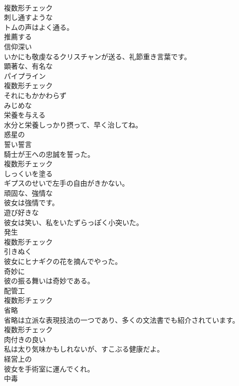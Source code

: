 \documentclass[8pt]{extreport}
\begin{document}
\begin{CJK}{UTF8}{min}
\\	複数形チェック
\\	[形容詞]	刺し通すような	
\\	トムの声はよく通る。	
\\	[動詞]	推薦する	
\\	[形容詞]	信仰深い	
\\	いかにも敬虔なるクリスチャンが送る、礼節重き言葉です。	
\\	[形容詞]	顕著な、有名な	
\\	[名詞]	パイプライン	
\\	複数形チェック
\\	[接続詞]	それにもかかわらず	
\\	[形容詞]	みじめな	
\\	[動詞]	栄養を与える	
\\	水分と栄養しっかり摂って、早く治してね。	
\\	[形容詞]	惑星の	
\\	[名詞]	誓い誓言	
\\	騎士が王への忠誠を誓った。	
\\	複数形チェック
\\	[動詞]	しっくいを塗る	
\\	ギプスのせいで左手の自由がきかない。	
\\	[形容詞]	頑固な、強情な	
\\	彼女は強情です。	
\\	[形容詞]	遊び好きな	
\\	彼女は笑い、私をいたずらっぽく小突いた。	
\\	[名詞]	発生	
\\	複数形チェック
\\	[動詞]	引きぬく	
\\	彼女にヒナギクの花を摘んでやった。	
\\	[副詞]	奇妙に	
\\	彼の振る舞いは奇妙である。	
\\	[名詞]	配管工	
\\	複数形チェック
\\	[名詞]	省略	
\\	省略は立派な表現技法の一つであり、多くの文法書でも紹介されています。	
\\	複数形チェック
\\	[形容詞]	肉付きの良い	
\\	私は太り気味かもしれないが、すこぶる健康だよ。	
\\	[形容詞]	経営上の	
\\	彼女を手術室に運んでくれ。	
\\	[名詞]	中毒	

\end{CJK}
\end{document}
